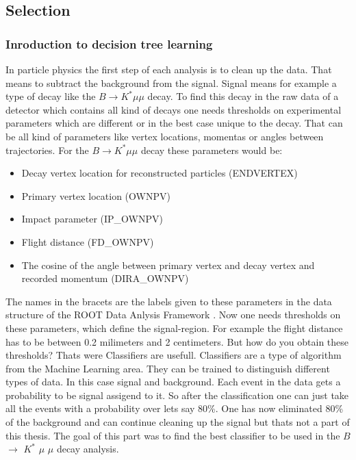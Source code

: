 \documentclass[english]{uzhpub}
\begin{document}

 \subsection{Selection} \label{sec:clas}

 \subsubsection{Inroduction to decision tree learning}

In particle physics the first step of each analysis is to clean up the data. That means to subtract the background from the signal. Signal means for example a type of decay like the $B \rightarrow K^* \mu \mu$ decay. To find this decay in the raw data of a detector which contains all kind of decays one needs thresholds on experimental parameters which are different or in the best case unique to the decay. That can be all kind of parameters like vertex locations, momentas or angles between trajectories. For the $B \rightarrow K^* \mu \mu$ decay these parameters would be:
\begin{itemize}
 \item Decay vertex location for reconstructed particles (ENDVERTEX)
 \item Primary vertex location (OWNPV)
 \item Impact parameter (IP\_OWNPV)
 \item Flight distance (FD\_OWNPV)
 \item The cosine of the angle between primary vertex and decay vertex and recorded momentum (DIRA\_OWNPV)
\end{itemize}
The names in the bracets are the labels given to these parameters in the data structure of the ROOT Data Anlysis Framework \cite{bib:root}.
Now one needs thresholds on these parameters, which define the signal-region. For example the flight distance has to be between 0.2 milimeters and 2 centimeters. But how do you obtain these thresholds? Thats were Classifiers are usefull. Classifiers are a type of algorithm from the Machine Learning area. They can be trained to distinguish different types of data. In this case signal and background. Each event in the data gets a probability to be signal assigend to it. So after the classification one can just take all the events with a probability over lets say 80\%. One has now eliminated 80\% of the background and can continue cleaning up the signal but thats not a part of this thesis. The goal of this part was to find the best classifier to be used in the  $B$ $\rightarrow$ $K^{*}$ $\mu$ $\mu$ decay analysis. \\
\end{document}
